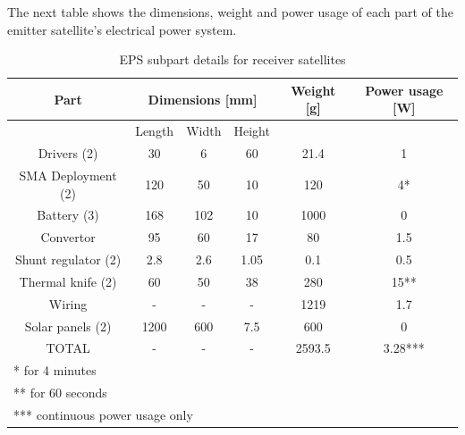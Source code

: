 The next table shows the dimensions, weight and power usage of each part of the emitter satellite's electrical power system.


\begin{table}[H!]
\centering
\begin{tabular}{cccccc}
\toprule
Part & \multicolumn{3}{c}{Dimensions [mm]} & Weight [g] & Power usage [W]\\ 
\midrule
 & Length & Width & Height & & \\ 
 Drivers (2) & 30 & 6 & 60 & 21.4 & 1 \\ 
 SMA Deployment (2) & 120 & 50 & 10 & 120 & 4* \\ 
 Battery (3) & 168 & 102 & 10 & 1000 & 0 \\ 
 Convertor & 95 & 60 & 17 & 80 & 1.5 \\ 
 Shunt regulator (2) & 2.8 & 2.6 & 1.05 & 0.1 & 0.5 \\ 
 Thermal knife (2) & 60 & 50 & 38 & 280 & 15**  \\
 Wiring & - & - & - & 1219 & 1.7 \\ 
 Solar panels (2) & 1200 & 600 & 7.5 & 600 & 0 \\
 \midrule
 TOTAL & - & - & - & 2593.5 & 3.28***  \\ 
\bottomrule
 \multicolumn{6}{l}{* for 4 minutes} \\
 \multicolumn{6}{l}{** for 60 seconds} \\
 \multicolumn{6}{l}{*** continuous power usage only} \\
\end{tabular}
\caption{EPS subpart details for receiver satellites}
\label{tab:EPS_details}
\end{table}